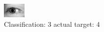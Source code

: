 \begin{figure}[h!]
\begin{center}
\includegraphics[width=0.60\columnwidth]{figures/ID3276_class_3_target_4.png}
\end{center}
\caption{ Classification: 3 actual target: 4}
\label{fig:ID3276_class_3_target_4}
\end{figure}
